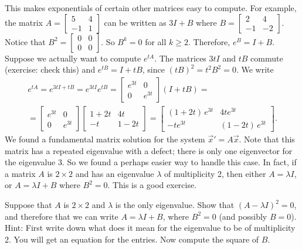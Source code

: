 This makes exponentials of certain other matrices easy to compute.  
For example, the matrix
$A = \left[ \begin{smallmatrix} 5 & 4 \\ -1 & 1 \end{smallmatrix} \right]$
can be written as
$3I + B$ where
$B = \left[ \begin{smallmatrix} 2 & 4 \\ -1 & -2 \end{smallmatrix} \right]$.
Notice that $B^2 = 
\left[ \begin{smallmatrix} 0 & 0 \\ 0 & 0 \end{smallmatrix} \right]$.  So
$B^k = 0$ for all $k \geq 2$.  Therefore, $e^B = I + B$.  Suppose we
actually want to compute $e^{tA}$.  The matrices $3tI$ and $tB$ commute
(exercise: check this)
and $e^{tB} = I + tB$, since ${(tB)}^2 = t^2 B^2 = 0$.
We write
\begin{multline*}
e^{tA} = 
e^{3tI + tB} = e^{3tI} e^{tB} = 
\begin{bmatrix} e^{3t} & 0 \\ 0 & e^{3t} \end{bmatrix}
\left(
I + tB
\right)
=
\\
=
\begin{bmatrix} e^{3t} & 0 \\ 0 & e^{3t} \end{bmatrix}
\begin{bmatrix} 1+2t & 4t \\ -t & 1-2t \end{bmatrix}
=
\begin{bmatrix} (1+2t)\,e^{3t} & 4te^{3t} \\ -te^{3t} & (1-2t)\,e^{3t} \end{bmatrix} .
\end{multline*}
We found a fundamental matrix solution for the
system ${\vec{x}}' = A \vec{x}$.  Note that this matrix has a repeated
eigenvalue with a defect; there is only one eigenvector for the eigenvalue
3.  So we found a perhaps easier way to handle this case.  In fact, if
a matrix $A$ is $2 \times 2$ and has an eigenvalue $\lambda$ of multiplicity
2, then
either $A = \lambda I$, or $A = \lambda I + B$ where $B^2 = 0$.  This is a
good exercise.

\begin{exercise}%
Suppose that $A$ is $2 \times 2$ and $\lambda$
is the only eigenvalue.  Show that ${(A - \lambda I)}^2 = 0$, and therefore
that we can write $A = \lambda I + B$, where $B^2 = 0$ (and possibly $B=0$).
Hint: First
write down what does it mean for the eigenvalue to be of multiplicity 2.
You will get
an equation for the entries.  Now compute the square of $B$.
\end{exercise}

